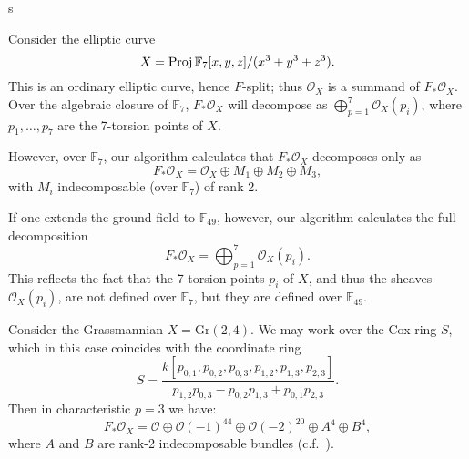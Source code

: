 s\documentclass{article}
\def\O{\mathcal O}
\numberwithin{equation}{section}
\theoremstyle{theorem}
\numberwithin{thm}{section}
\theoremstyle{definition}
\begin{document}
\begin{exa}\label{algclos}
  Consider the elliptic curve
  \[ X = \operatorname{Proj} \mathbb F_7[x,y,z]/(x^3+y^3+z^3). \]
  This is an ordinary elliptic curve, hence $F$-split; thus $\O_X$ is a summand of $F_* \O_X$. Over the algebraic closure of $\mathbb F_7$, $F_*\O_X$ will decompose as $\bigoplus_{p=1}^7 \O_X(p_i)$, where $p_1,\dots,p_7$ are the 7-torsion points of $X$.

  However, over $\mathbb F_7$, our algorithm calculates that $F_*\O_X$ decomposes only as 
  $$ F_* \O_X =\O_X \oplus M_1\oplus M_2\oplus M_3, $$
  with $M_i$ indecomposable (over $\mathbb F_7$) of rank 2.

  If one extends the ground field to $\mathbb F_{49}$, however, our algorithm calculates the full decomposition 
  $$ F_* \O_X=\bigoplus_{p=1}^7 \O_X(p_i). $$
  This reflects the fact that the 7-torsion points $p_i$ of $X$, and thus the sheaves $\O_X(p_i)$, are not defined over $\mathbb F_7$, but they are defined over $\mathbb F_{49}$.
\end{exa}

\begin{exa}
  Consider the Grassmannian $X = \mathrm{Gr(2,4)}$. We may work over the Cox ring $S$,
  which in this case coincides with the coordinate ring
  \[ S = \frac{k[p_{0,1},p_{0,2},p_{0,3},p_{1,2},p_{1,3},p_{2,3}]}{p_{1,2}p_{0,3}-p_{0,2}p_{1,3}+p_{0,1}p_{2,3}}. \]
  Then in characteristic $p=3$ we have:
  \[ F_*\O_X = \O \oplus \O(-1)^{44} \oplus \O(-2)^{20} \oplus A^4 \oplus B^4, \]
  where $A$ and $B$ are rank-2 indecomposable bundles (c.f.~\cite{RSVdB22}).
\end{exa}
\end{document}
